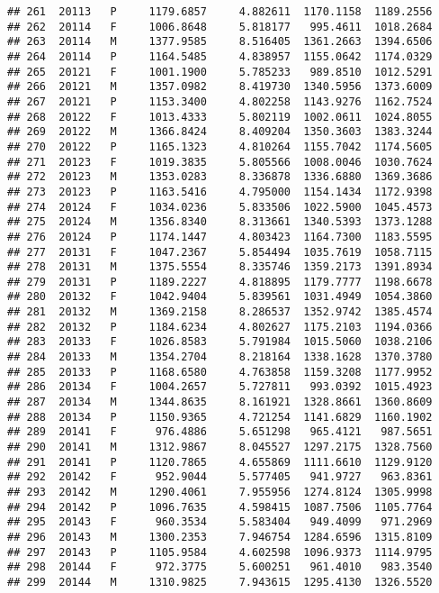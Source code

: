 \documentclass[]{article}
\begin{document}
\begin{verbatim}
## 261  20113   P     1179.6857     4.882611  1170.1158  1189.2556
## 262  20114   F     1006.8648     5.818177   995.4611  1018.2684
## 263  20114   M     1377.9585     8.516405  1361.2663  1394.6506
## 264  20114   P     1164.5485     4.838957  1155.0642  1174.0329
## 265  20121   F     1001.1900     5.785233   989.8510  1012.5291
## 266  20121   M     1357.0982     8.419730  1340.5956  1373.6009
## 267  20121   P     1153.3400     4.802258  1143.9276  1162.7524
## 268  20122   F     1013.4333     5.802119  1002.0611  1024.8055
## 269  20122   M     1366.8424     8.409204  1350.3603  1383.3244
## 270  20122   P     1165.1323     4.810264  1155.7042  1174.5605
## 271  20123   F     1019.3835     5.805566  1008.0046  1030.7624
## 272  20123   M     1353.0283     8.336878  1336.6880  1369.3686
## 273  20123   P     1163.5416     4.795000  1154.1434  1172.9398
## 274  20124   F     1034.0236     5.833506  1022.5900  1045.4573
## 275  20124   M     1356.8340     8.313661  1340.5393  1373.1288
## 276  20124   P     1174.1447     4.803423  1164.7300  1183.5595
## 277  20131   F     1047.2367     5.854494  1035.7619  1058.7115
## 278  20131   M     1375.5554     8.335746  1359.2173  1391.8934
## 279  20131   P     1189.2227     4.818895  1179.7777  1198.6678
## 280  20132   F     1042.9404     5.839561  1031.4949  1054.3860
## 281  20132   M     1369.2158     8.286537  1352.9742  1385.4574
## 282  20132   P     1184.6234     4.802627  1175.2103  1194.0366
## 283  20133   F     1026.8583     5.791984  1015.5060  1038.2106
## 284  20133   M     1354.2704     8.218164  1338.1628  1370.3780
## 285  20133   P     1168.6580     4.763858  1159.3208  1177.9952
## 286  20134   F     1004.2657     5.727811   993.0392  1015.4923
## 287  20134   M     1344.8635     8.161921  1328.8661  1360.8609
## 288  20134   P     1150.9365     4.721254  1141.6829  1160.1902
## 289  20141   F      976.4886     5.651298   965.4121   987.5651
## 290  20141   M     1312.9867     8.045527  1297.2175  1328.7560
## 291  20141   P     1120.7865     4.655869  1111.6610  1129.9120
## 292  20142   F      952.9044     5.577405   941.9727   963.8361
## 293  20142   M     1290.4061     7.955956  1274.8124  1305.9998
## 294  20142   P     1096.7635     4.598415  1087.7506  1105.7764
## 295  20143   F      960.3534     5.583404   949.4099   971.2969
## 296  20143   M     1300.2353     7.946754  1284.6596  1315.8109
## 297  20143   P     1105.9584     4.602598  1096.9373  1114.9795
## 298  20144   F      972.3775     5.600251   961.4010   983.3540
## 299  20144   M     1310.9825     7.943615  1295.4130  1326.5520

\end{verbatim}
\end{document}
